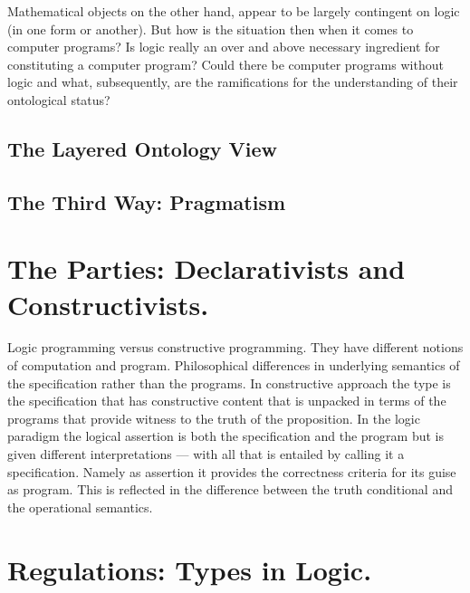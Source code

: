 \documentclass[]{article}
\begin{document}
Mathematical objects on the other hand, appear to be largely contingent on logic (in one form or another). But how is the situation then when it comes to computer programs? Is logic really an over and above necessary ingredient for constituting a computer program? Could there be computer programs without logic and what, subsequently, are the ramifications for the understanding of their ontological status?

\subsection{The Layered Ontology View}


{\color{red}{this passage follows on Nicola's and Giuseppe's work for SEP}}

\subsection{The Third Way: Pragmatism}


{\color{red}{this passage does not exist. A student of mine is doing some work in this direction, wonder whether we should explore.}}





\section{The Parties: Declarativists and Constructivists.}


{\color{red}{Ray's}}

Logic programming versus constructive programming. They have different notions of computation and program. Philosophical differences in underlying semantics of the specification rather than the programs. In constructive approach the type is the specification that has constructive content that is unpacked in terms of the programs that provide witness to the truth of the proposition. In the logic paradigm the logical assertion is both the specification and the program but is given different interpretations --- with all that is entailed by calling it a specification. Namely as assertion it provides the correctness criteria for its guise as program. This is reflected in the difference between the truth conditional and the operational semantics. 



\section{Regulations: Types in Logic.}
\end{document}
